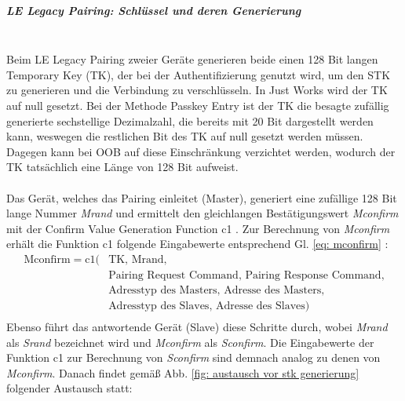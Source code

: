 \subparagraph{LE Legacy Pairing: Schlüssel und deren Generierung} \mbox{} \vspace{0.2cm} \\
Beim LE Legacy Pairing zweier Geräte generieren beide einen 128 Bit langen Temporary Key (TK), der bei der Authentifizierung genutzt wird, um den STK zu generieren und die Verbindung zu verschlüsseln. In Just Works wird der TK auf null gesetzt. Bei der Methode Passkey Entry ist der TK die besagte zufällig generierte sechstellige Dezimalzahl, die bereits mit 20 Bit dargestellt werden kann, weswegen die restlichen Bit des TK auf null gesetzt werden müssen. Dagegen kann bei OOB auf diese Einschränkung verzichtet werden, wodurch der TK tatsächlich eine Länge von 128 Bit aufweist.
\\\\
Das Gerät, welches das Pairing einleitet (Master), generiert eine zufällige 128 Bit lange Nummer \textit{Mrand} und ermittelt den gleichlangen Bestätigungswert \textit{Mconfirm} mit der Confirm Value Generation Function c1 \cite{BtSpec4.2_2288}. 
Zur Berechnung von \textit{Mconfirm} erhält die Funktion c1 folgende Eingabewerte entsprechend Gl. \ref{eq: mconfirm} \cite{BtSpec4.2_2305-2306}:
\begin{equation}
\begin{split}
    \text{Mconfirm} = \text{c1}(& \text{TK, Mrand,} \\
    & \text{Pairing Request Command, Pairing Response Command,} \\
    & \text{Adresstyp des Masters, Adresse des Masters,} \\
    & \text{Adresstyp des Slaves, Adresse des Slaves}) \\
\end{split}
    \label{eq: mconfirm}
\end{equation}
Ebenso führt das antwortende Gerät (Slave) diese Schritte durch, wobei \textit{Mrand} als \textit{Srand} bezeichnet wird und \textit{Mconfirm} als \textit{Sconfirm}. Die Eingabewerte der Funktion c1 zur Berechnung von \textit{Sconfirm} sind demnach analog zu denen von \textit{Mconfirm}. Danach findet gemäß Abb. \ref{fig: austausch vor stk generierung} folgender Austausch statt:

